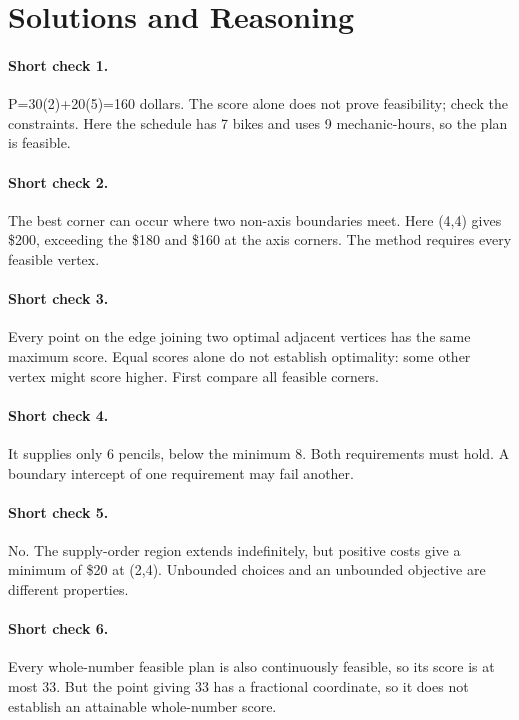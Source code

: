 \documentclass[11pt,letterpaper]{article}
\begin{document}
\clearpage
{\setlength{\parskip}{4pt}\titlespacing*{\paragraph}{0pt}{5pt}{.75em}
\section*{Solutions and Reasoning}

\paragraph{Short check 1.}
P=30(2)+20(5)=160 dollars. The score alone does not prove feasibility; check the constraints. Here the schedule has 7 bikes and uses 9 mechanic-hours, so the plan is feasible.


\paragraph{Short check 2.}
The best corner can occur where two non-axis boundaries meet. Here (4,4) gives \$200, exceeding the \$180 and \$160 at the axis corners. The method requires every feasible vertex.


\paragraph{Short check 3.}
Every point on the edge joining two optimal adjacent vertices has the same maximum score. Equal scores alone do not establish optimality: some other vertex might score higher. First compare all feasible corners.


\paragraph{Short check 4.}
It supplies only 6 pencils, below the minimum 8. Both requirements must hold. A boundary intercept of one requirement may fail another.


\paragraph{Short check 5.}
No. The supply-order region extends indefinitely, but positive costs give a minimum of \$20 at (2,4). Unbounded choices and an unbounded objective are different properties.


\paragraph{Short check 6.}
Every whole-number feasible plan is also continuously feasible, so its score is at most 33. But the point giving 33 has a fractional coordinate, so it does not establish an attainable whole-number score.


}
\end{document}
